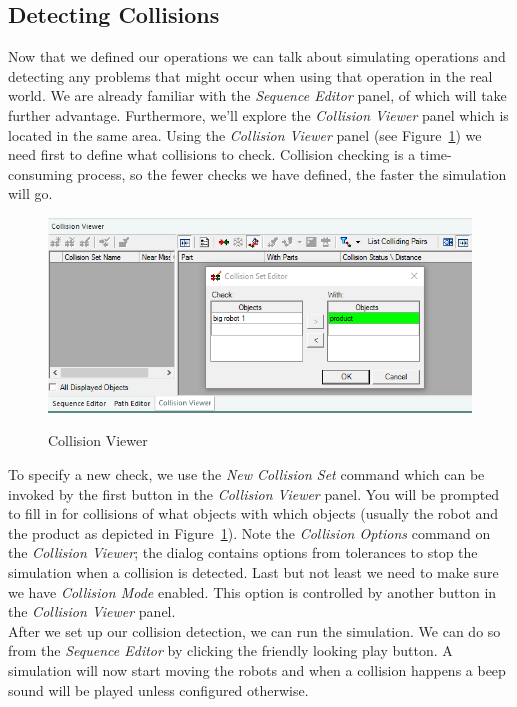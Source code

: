 \subsection{Detecting Collisions}
Now that we defined our operations we can talk about simulating operations and detecting any problems that might occur when using that operation in the real world.
We are already familiar with the \emph{Sequence Editor} panel, of which will take further advantage. Furthermore, we'll explore the \emph{Collision Viewer} panel which is located in the same area.
Using the \emph{Collision Viewer} panel (see Figure~\ref{fig:CollisionViewer}) we need first to define what collisions to check.
Collision checking is a time-consuming process, so the fewer checks we have defined, the faster the simulation will go. \\

\begin{figure}[H]
    \caption{Collision Viewer}
    \centering
    \includegraphics[width=\textwidth]{collision_viewer}
    \label{fig:CollisionViewer}
\end{figure}

To specify a new check, we use the \emph{New Collision Set} command which can be invoked by the first button in the \emph{Collision Viewer} panel.
You will be prompted to fill in for collisions of what objects with which objects (usually the robot and the product as depicted in Figure~\ref{fig:CollisionViewer}).
Note the \emph{Collision Options} command on the \emph{Collision Viewer}; the dialog contains options from tolerances to stop the simulation when a collision is detected.
Last but not least we need to make sure we have \emph{Collision Mode} enabled. 
This option is controlled by another button in the \emph{Collision Viewer} panel. \\

After we set up our collision detection, we can run the simulation.
We can do so from the \emph{Sequence Editor} by clicking the friendly looking play button. 
A simulation will now start moving the robots and when a collision happens a beep sound will be played unless configured otherwise. \\